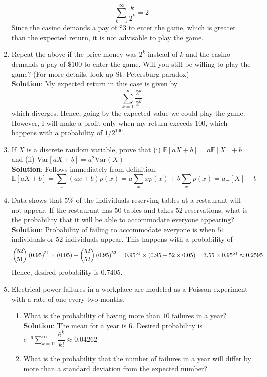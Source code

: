 \documentclass{article}
\newcommand{\dsum}{\displaystyle\sum}
\newcommand{\Eb}{\mathbb{E}}
\newcommand{\bkt}[1]{\left(#1\right)}
\newcommand{\soln}[1]{\textbf{Solution}:#1}
\begin{document}
\begin{enumerate}
{		$$\dsum_{k=1}^{\infty} \dfrac{k}{2^k} = 2$$
		Since the casino demands a pay of $\$3$ to enter the game, which is greater than the expected return, it is not advisable to play the game.
		}
		\item
		Repeat the above if the price money was $2^k$ instead of $k$ and the casino demands a pay of $\$100$ to enter the game. Will you still be willing to play the game? (For more details, look up St. Petersburg paradox)\\
		\soln{
		My expected return in this case is given by
		$$\dsum_{k=1}^{\infty} \dfrac{2^k}{2^k}$$
		which diverges. Hence, going by the expected value we could play the game. However, I will make a profit only when my return exceeds $100$, which happens with a probability of $1/2^{100}$.
		}
		\item
		If $X$ is a discrete random variable, prove that (i) $\mathbb{E}\left[aX +b\right] = a \mathbb{E}\left[X\right] + b$ and (ii) $\text{Var}\left[aX +b\right] = a^2 \text{Var}\bkt{X}$\\
		\soln{
		Follows immediately from definition.
		$$\Eb\left[aX+b\right] = \dsum_{x} \bkt{ax+b}p(x) = a \dsum_{x} xp(x) + b\dsum_{x} p(x) = a \Eb\left[X\right]+b$$
		}
		\item
		Data shows that $5\%$ of the individuals reserving tables at a restaurant will not appear. If the restaurant has $50$ tables and takes $52$ reservations, what is the probability that it will be able to accommodate everyone appearing?\\
		\soln{
		Probability of failing to accommodate everyone is when $51$ individuals or $52$ individuals appear. This happens with a probability of
		$$\dbinom{52}{51} \bkt{0.95}^{51} \times \bkt{0.05} + \dbinom{52}{52} \bkt{0.95}^{52} = 0.95^{51} \times \bkt{0.95+52 \times 0.05} = 3.55 \times 0.95^{51} \approx 0.2595$$
		Hence, desired probability is $0.7405$.
		}
		\item
		Electrical power failures in a workplace are modeled as a Poisson experiment with a rate of one every two months.
		\begin{enumerate}
			\item
			What is the probability of having more than $10$ failures in a year?\\
			\soln{
			The mean for a year is $6$. Desired probability is $e^{-6} \dsum_{k=11}^{\infty} \dfrac{6^{k}}{k!} \approx 0.04262$
			}
			\item
			What is the probability that the number of failures in a year will differ by more than a standard deviation from the expected number?\\

\end{enumerate}
\end{enumerate}
\end{document}
